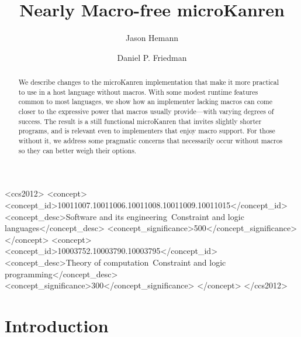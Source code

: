 \documentclass[sigplan,balance=true,pbalance=true,natbib=false]{acmart}
\begin{document}
\title{Nearly Macro-free microKanren}

\author{Jason Hemann}
\author{Daniel P. Friedman}

\renewcommand{\shortauthors}{Hemann and Friedman}

\begin{abstract}

  We describe changes to the microKanren implementation that make it
  more practical to use in a host language without macros. With
  some modest runtime features common to most languages, we
  show how an implementer lacking macros can come closer to the
  expressive power that macros usually provide---with varying degrees
  of success. The result is a still functional microKanren that
  invites slightly shorter programs, and is relevant even to
  implementers that enjoy macro support. For those without it, we
  address some pragmatic concerns that necessarily occur without
  macros so they can better weigh their options.

\end{abstract}

\begin{CCSXML}
<ccs2012>
   <concept>
       <concept_id>10011007.10011006.10011008.10011009.10011015</concept_id>
       <concept_desc>Software and its engineering~Constraint and logic languages</concept_desc>
       <concept_significance>500</concept_significance>
   </concept>
   <concept>
       <concept_id>10003752.10003790.10003795</concept_id>
       <concept_desc>Theory of computation~Constraint and logic programming</concept_desc>
       <concept_significance>300</concept_significance>
   </concept>
 </ccs2012>
\end{CCSXML}



\maketitle

\section{Introduction}
\end{document}
